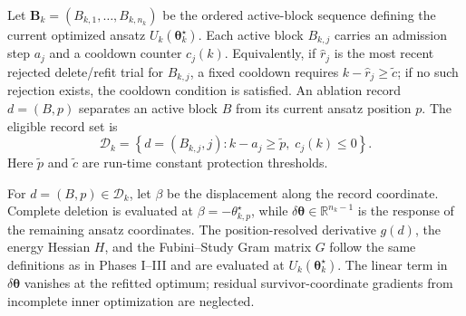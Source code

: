 \documentclass[
  reprint,
  amsmath,
  amssymb,
  aps,
  pra,
  nofootinbib,
  superscriptaddress,
  floatfix
]{revtex4-2}
\begin{document}
Let \(\mathbf B_k=(B_{k,1},\ldots,B_{k,n_k})\) be the ordered active-block
sequence defining the current optimized ansatz
\(U_k(\boldsymbol\theta_k^\star)\). Each active block \(B_{k,j}\) carries an
admission step \(a_j\) and a cooldown counter \(c_j(k)\). Equivalently, if
\(\hat r_j\) is the most recent rejected delete/refit trial for \(B_{k,j}\), a
fixed cooldown requires
\(k-\hat r_j\ge\tilde c\); if no such rejection exists, the cooldown condition
is satisfied. An ablation record \(d=(B,p)\) separates an active block \(B\)
from its current ansatz position \(p\). The eligible record set is
\begin{equation*}
\mathcal D_k
=
\left\{
d=(B_{k,j},j)
:
k-a_j\ge \tilde p,\;
c_j(k)\le0
\right\}.
\end{equation*}
Here \(\tilde p\) and \(\tilde c\) are run-time constant protection thresholds.

For \(d=(B,p)\in\mathcal D_k\), let \(\beta\) be the displacement along the
record coordinate. Complete deletion is evaluated at
\(\beta=-\theta_{k,p}^\star\), while
\(\delta\boldsymbol\theta\in\mathbb R^{n_k-1}\) is the response of the
remaining ansatz coordinates. The position-resolved derivative \(g(d)\), the
energy Hessian \(H\), and the Fubini--Study Gram matrix \(G\) follow the same
definitions as in Phases I--III and are evaluated at
\(U_k(\boldsymbol\theta_k^\star)\). The linear term in
\(\delta\boldsymbol\theta\) vanishes at the refitted optimum; residual
survivor-coordinate gradients from incomplete inner optimization are
neglected.
\end{document}
